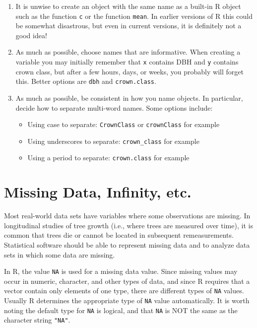 \documentclass[]{krantz}
\providecommand{\tightlist}{%
  \setlength{\itemsep}{0pt}\setlength{\parskip}{0pt}}
\theoremstyle{definition}
\theoremstyle{definition}
\theoremstyle{definition}
\theoremstyle{remark}
\begin{document}
\begin{enumerate}
\def\labelenumi{\arabic{enumi}.}
\setcounter{enumi}{1}
\item
  It is unwise to create an object with the same name as a built-in R
  object such as the function \texttt{c} or the function \texttt{mean}.
  In earlier versions of R this could be somewhat disastrous, but even
  in current versions, it is definitely not a good idea!
\item
  As much as possible, choose names that are informative. When creating
  a variable you may initially remember that \texttt{x} contains DBH and
  \texttt{y} contains crown class, but after a few hours, days, or
  weeks, you probably will forget this. Better options are \texttt{dbh}
  and \texttt{crown.class}.
\item
  As much as possible, be consistent in how you name objects. In
  particular, decide how to separate multi-word names. Some options
  include:

  \begin{itemize}
  \tightlist
  \item
    Using case to separate: \texttt{CrownClass} or \texttt{crownClass}
    for example
  \item
    Using underscores to separate: \texttt{crown\_class} for example
  \item
    Using a period to separate: \texttt{crown.class} for example
  \end{itemize}
\end{enumerate}

\section{Missing Data, Infinity, etc.}\label{missing-data-infinity-etc.}

Most real-world data sets have variables where some observations are
missing. In longitudinal studies of tree growth (i.e., where trees are
measured over time), it is common that trees die or cannot be located in
subsequent remeasurements. Statistical software should be able to
represent missing data and to analyze data sets in which some data are
missing.

In R, the value \texttt{NA} is used for a missing data value. Since
missing values may occur in numeric, character, and other types of data,
and since R requires that a vector contain only elements of one type,
there are different types of \texttt{NA} values. Usually R determines
the appropriate type of \texttt{NA} value automatically. It is worth
noting the default type for \texttt{NA} is logical, and that \texttt{NA}
is NOT the same as the character string \texttt{"NA"}.
\end{document}
